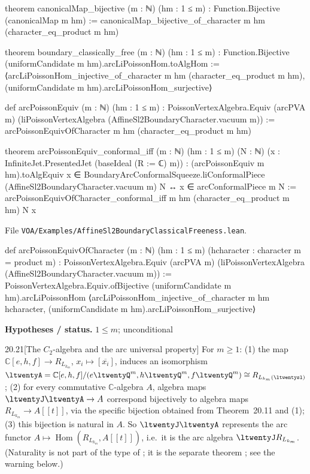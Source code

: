\documentclass[11pt,openany]{book}
\newcommand{\lean}[1]{\texttt{\detokenize{#1}}}
\newcommand{\leanpath}[1]{\texttt{\small #1}}
\theoremstyle{definition}
\theoremstyle{plain}
\newcommand{\C}{{\mathbb{C}}}
\begin{document}
\begin{leancode}
theorem canonicalMap_bijective (m : ℕ) (hm : 1 ≤ m) :
    Function.Bijective (canonicalMap m hm) :=
  canonicalMap_bijective_of_character m hm (character_eq_product m hm)

theorem boundary_classically_free (m : ℕ) (hm : 1 ≤ m) :
    Function.Bijective (uniformCandidate m hm).arcLiPoissonHom.toAlgHom :=
  ⟨arcLiPoissonHom_injective_of_character m hm (character_eq_product m hm),
    (uniformCandidate m hm).arcLiPoissonHom_surjective⟩

def arcPoissonEquiv (m : ℕ) (hm : 1 ≤ m) :
    PoissonVertexAlgebra.Equiv (arcPVA m)
      (liPoissonVertexAlgebra (AffineSl2BoundaryCharacter.vacuum m)) :=
  arcPoissonEquivOfCharacter m hm (character_eq_product m hm)

theorem arcPoissonEquiv_conformal_iff (m : ℕ) (hm : 1 ≤ m) (N : ℕ)
    (x : InfiniteJet.PresentedJet (baseIdeal (R := ℂ) m)) :
    (arcPoissonEquiv m hm).toAlgEquiv x ∈
      BoundaryArcConformalSqueeze.liConformalPiece (AffineSl2BoundaryCharacter.vacuum m) N ↔
      x ∈ arcConformalPiece m N :=
  arcPoissonEquivOfCharacter_conformal_iff m hm (character_eq_product m hm) N x
\end{leancode}
{\raggedright\noindent File \leanpath{VOA/\allowbreak Examples/\allowbreak AffineSl2BoundaryClassicalFreeness.lean}.\par}
\begin{leancode}
def arcPoissonEquivOfCharacter (m : ℕ) (hm : 1 ≤ m)
    (hcharacter : character m = product m) :
    PoissonVertexAlgebra.Equiv (arcPVA m) (liPoissonVertexAlgebra (AffineSl2BoundaryCharacter.vacuum m)) :=
  PoissonVertexAlgebra.Equiv.ofBijective (uniformCandidate m hm).arcLiPoissonHom
    ⟨arcLiPoissonHom_injective_of_character m hm hcharacter,
      (uniformCandidate m hm).arcLiPoissonHom_surjective⟩
\end{leancode}
\noindent\textbf{Hypotheses / status.} $1\le m$; unconditional\par
\medskip
\begin{btheorem}{20.21}[The $C_2$-algebra and the arc universal property]
For $m\ge1$: (1) the map $\C[e,h,f]\to R_{L_{k_m}}$, $x_i\mapsto[\overline{x_i}]$, induces an isomorphism
$\ltwentyA=\C[e,h,f]/(e\ltwentyQ^m,h\ltwentyQ^m,f\ltwentyQ^m)\cong R_{L_{k_m}(\ltwentysl)}$; (2) for every commutative
$\C$-algebra $A$, algebra maps $\ltwentyJ\ltwentyA\to A$ correspond bijectively to algebra maps
$R_{L_{k_m}}\to A[[t]]$, via the specific bijection obtained from Theorem~20.11 and (1); (3) this bijection is natural in $A$. So
$\ltwentyJ\ltwentyA$ represents the arc functor $A\mapsto\operatorname{Hom}(R_{L_{k_m}},A[[t]])$, i.e.\ it is the arc algebra
$\ltwentyJ R_{L_{k_m}}$. (Naturality is not part of the type of \lean{actualC2ArcEquiv}; it is the separate theorem
\lean{actualC2ArcEquiv_natural}; see the warning below.)
\end{btheorem}
\end{document}

